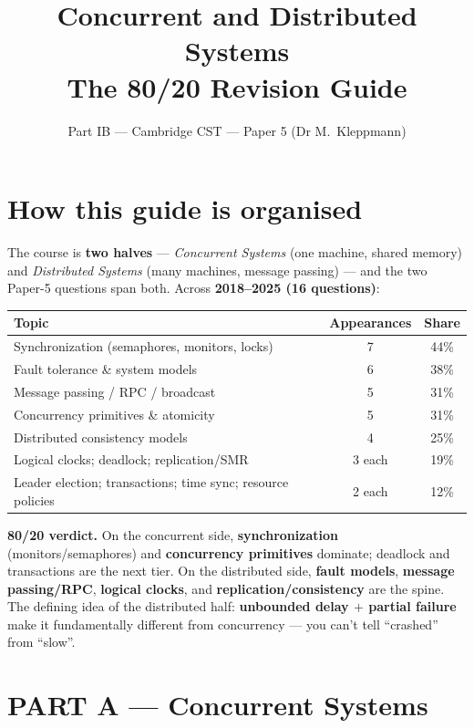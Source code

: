 \documentclass[11pt,a4paper]{article}
\title{\vspace{-1.5cm}\textbf{Concurrent and Distributed Systems} \\[2pt] \large The 80/20 Revision Guide}
\author{\small Part IB --- Cambridge CST --- Paper 5 (Dr M.\ Kleppmann)}
\date{}
\begin{document}
\maketitle
\vspace{-0.8cm}

\section*{How this guide is organised}

The course is \textbf{two halves} --- \emph{Concurrent Systems} (one machine, shared memory) and \emph{Distributed Systems} (many machines, message passing) --- and the two Paper-5 questions span both. Across \textbf{2018--2025 (16 questions)}:

\begin{center}
\begin{tabular}{lcc}
\hline
\textbf{Topic} & \textbf{Appearances} & \textbf{Share} \\
\hline
Synchronization (semaphores, monitors, locks) & 7 & 44\% \\
Fault tolerance \& system models & 6 & 38\% \\
Message passing / RPC / broadcast & 5 & 31\% \\
Concurrency primitives \& atomicity & 5 & 31\% \\
Distributed consistency models & 4 & 25\% \\
Logical clocks; deadlock; replication/SMR & 3 each & 19\% \\
Leader election; transactions; time sync; resource policies & 2 each & 12\% \\
\hline
\end{tabular}
\end{center}

\textbf{80/20 verdict.} On the concurrent side, \textbf{synchronization} (monitors/semaphores) and \textbf{concurrency primitives} dominate; deadlock and transactions are the next tier. On the distributed side, \textbf{fault models}, \textbf{message passing/RPC}, \textbf{logical clocks}, and \textbf{replication/consistency} are the spine. The defining idea of the distributed half: \textbf{unbounded delay $+$ partial failure} make it fundamentally different from concurrency --- you can't tell ``crashed'' from ``slow''.

\hrulefill

\section*{PART A --- Concurrent Systems}
\end{document}
